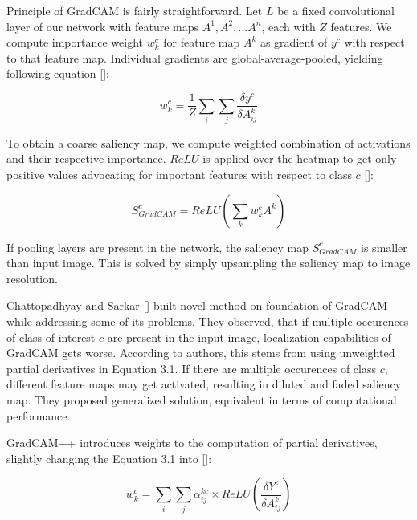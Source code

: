 Principle of GradCAM is fairly straightforward. Let $L$ be a fixed convolutional layer of our network with feature maps $A^1, A^2, ... A^n$, each with $Z$ features. We compute importance weight $w^c_k$ for feature map $A^k$ as gradient of $y^c$ with respect to that feature map. Individual gradients are global-average-pooled, yielding following equation []:

\begin{equation}
    w^c_k = \frac{1}{Z} \sum_i \sum_j \frac{\delta y^c}{\delta A^k_{ij}}
\end{equation}

To obtain a coarse saliency map, we compute weighted combination of activations and their respective importance. $ReLU$ is applied over the heatmap to get only positive values advocating for important features with respect to class $c$ []:

\begin{equation}
    S^c_{GradCAM} = ReLU(\sum_k w^c_k A^k)
\end{equation}

If pooling layers are present in the network, the saliency map $S^c_{GradCAM}$ is smaller than input image. This is solved by simply upsampling the saliency map to image resolution.\newline


\noindent
Chattopadhyay and Sarkar [] built novel method on foundation of GradCAM while addressing some of its problems. They observed, that if multiple occurences of class of interest $c$ are present in the input image, localization capabilities of GradCAM gets worse. According to authors, this stems from using unweighted partial derivatives in Equation 3.1. If there are multiple occurences of class $c$, different feature maps may get activated, resulting in diluted and faded saliency map. They proposed generalized solution, equivalent in terms of computational performance.  


GradCAM++ introduces weights to the computation of partial derivatives, slightly changing the Equation 3.1 into []:

\begin{equation}
    w^c_k = \sum_i \sum_j \alpha^{kc}_{ij} \times ReLU(\frac{\delta Y^c}{\delta A^k_{ij}})
\end{equation}

